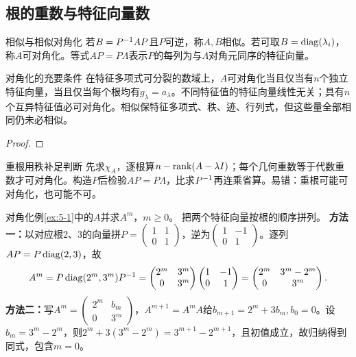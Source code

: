 \subsection{根的重数与特征向量数}
\begin{definition}{相似与相似对角化}
若$B=P^{-1} AP$且$P$可逆，称$A,B$相似。若可取$B=\operatorname{diag}(\lambda_i)$，称$A$可对角化。等式$AP=P\Lambda$表示$P$的每列为与$\Lambda$对角元同序的特征向量。
\end{definition}
\begin{theorem}{对角化的充要条件}
在特征多项式可分裂的数域上，$A$可对角化当且仅当有$n$个独立特征向量，当且仅当每个根均有$g_\lambda=a_\lambda$。不同特征值的特征向量线性无关；具有$n$个互异特征值必可对角化。相似保特征多项式、秩、迹、行列式，但这些量全部相同仍未必相似。
\end{theorem}
\begin{proof}

\end{proof}
\begin{method}{重根用秩补足判断}
先求$\chi_A$，逐根算$n-\operatorname{rank}(A-\lambda I)$；每个几何重数等于代数重数才可对角化。构造$P$后检验$AP=P\Lambda$，比求$P^{-1}$再连乘省算。易错：重根可能可对角化，也可能不可。
\end{method}
{对角化例\ref{ex:5-1}中的$A$并求$A^m$，$m\ge0$。}
{把两个特征向量按根的顺序拼列。}
{\textbf{方法一：}以对应根2、3的向量拼$P=\begin{pmatrix}1&1\\0&1\end{pmatrix}$，逆为$\begin{pmatrix}1&-1\\0&1\end{pmatrix}$。逐列$AP=P\operatorname{diag}(2,3)$，故
\[A^m=P\operatorname{diag}(2^m,3^m)P^{-1}=\begin{pmatrix}2^m&3^m\\0&3^m\end{pmatrix}\begin{pmatrix}1&-1\\0&1\end{pmatrix}=\begin{pmatrix}2^m&3^m-2^m\\0&3^m\end{pmatrix}.\]
\textbf{方法二：}写$A^m=\begin{pmatrix}2^m&b_m\\0&3^m\end{pmatrix}$，$A^{m+1}=A^mA$给$b_{m+1}=2^m+3b_m,b_0=0$。设$b_m=3^m-2^m$，则$2^m+3(3^m-2^m)=3^{m+1}-2^{m+1}$，且初值成立，故归纳得到同式，包含$m=0$。}
